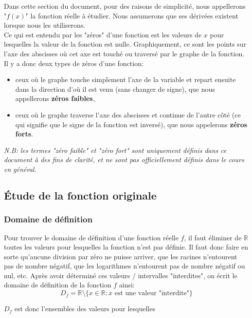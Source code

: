 \documentclass{article}
\numberwithin{equation}{section}
\begin{document}
Dans cette section du document, pour des raisons de simplicité, nous appellerons "\(f(x)\)" la fonction réelle à étudier. Nous assumerons que ses dérivées existent lorsque nous les utiliserons. \\
Ce qui est entendu par les "zéros" d'une fonction est les valeurs de \(x\) pour lesquelles la valeur de la fonction est nulle. Graphiquement, ce sont les points sur l'axe des abscisses où cet axe est touché ou traversé par le graphe de la fonction. \\
Il y a donc deux types de zéros d'une fonction: 
\begin{itemize}
	\item ceux où le graphe touche simplement l'axe de la variable et repart ensuite dans la direction d'où il est venu (sans changer de signe), que nous appellerons \textbf{zéros faibles}, %
	\item ceux où le graphe traverse l'axe des abscisses et continue de l'autre côté (ce qui signifie que le signe de la fonction est inversé), que nous appelerons \textbf{zéros forts}.
\end{itemize}
\emph{N.B: les termes "zéro faible" et "zéro fort" sont uniquement définis dans ce document à des fins de clarité, et ne sont pas officiellement définis dans le cours en général.}

\subsection{Étude de la fonction originale}

\subsubsection{Domaine de définition}
Pour trouver le domaine de définition d'une fonction réelle \(f\), il faut éliminer de \(\mathbb{R}\) toutes les valeurs pour lesquelles la fonction n'est pas définie. Il faut donc faire en sorte qu'aucune division par zéro ne puisse arriver, que les racines n'entourent pas de nombre négatif, que les logarithmes n'entourent pas de nombre négatif ou nul, etc. Après avoir déterminé ces valeurs / intervalles "interdites", on écrit le domaine de définition de la fonction \(f\) ainsi:
\begin{equation*}
	D_f = \mathbb{R} \setminus \{ x \in \mathbb{R} : x \text{ est une valeur "interdite"} \}
\end{equation*}

\(D_f\) est donc l'ensembles des valeurs pour lesquelles 
\end{document}
